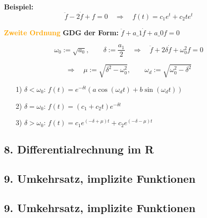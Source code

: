 \textbf{Beispiel:} \quad
\[
\ddot{f} - 2\dot{f} + f = 0 \quad \Rightarrow \quad f(t) = c_1 e^t + c_2 t e^t
\]

\vspace{1em}

\textcolor{orange}{\textbf{Zweite Ordnung}} \quad
\textbf{GDG der Form:} \quad $\ddot{f} + a\_1 \dot{f} + a\_0 f = 0$ \qquad {}

\[
\omega_0 := \sqrt{a_0}, \qquad \delta := \frac{a_1}{2}
\quad \Rightarrow \quad
\ddot{f} + 2\delta \dot{f} + \omega_0^2 f = 0
\]

\[
\Rightarrow \quad \mu := \sqrt{\delta^2 - \omega_0^2}, \qquad \omega_d := \sqrt{\omega_0^2 - \delta^2}
\]

\begin{itemize}
  \item[1)] \( \delta < \omega_0 \): \quad
    \( f(t) = e^{-\delta t} \left( a \cos(\omega_d t) + b \sin(\omega_d t) \right) \)

  \item[2)] \( \delta = \omega_0 \): \quad
    \( f(t) = (c_1 + c_2 t) e^{-\delta t} \)

  \item[3)] \( \delta > \omega_0 \): \quad
    \( f(t) = c_1 e^{(-\delta + \mu)t} + c_2 e^{(-\delta - \mu)t} \)
\end{itemize}


\subsection{8. Differentialrechnung im R}

\subsection{9. Umkehrsatz, implizite Funktionen}

\subsection{9. Umkehrsatz, implizite Funktionen}